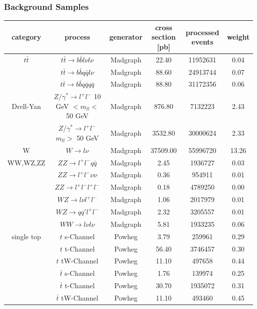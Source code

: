 \subsubsection{Background Samples} 
\begin{table}
\small
\begin{center}
\begin{tabular}{c|c|c|c|c|c}
category & process & generator &  cross section [pb] & processed events & weight\\
\hline 
$t\bar{t}$ & $t\bar{t} \rightarrow b\bar{b}l\nu l\nu$ & Madgraph & 22.40 & 11952631 & 0.04 \\
 & $t\bar{t} \rightarrow b\bar{b}q\bar{q}l\nu$ & Madgraph & 88.60 & 24913744 & 0.07 \\
 & $t\bar{t} \rightarrow b\bar{b}q\bar{q}q\bar{q}$ & Madgraph & 88.80 & 31172356 & 0.06 \\
\hline 
Drell-Yan & $Z/\gamma^{*} \rightarrow l^{+}l^{-}$ 10 GeV $< m_{ll} <$ 50 GeV & Madgraph & 876.80 & 7132223 & 2.43 \\
 & $Z/\gamma^{*} \rightarrow l^{+}l^{-}$ $m_{ll} >$ 50 GeV & Madgraph & 3532.80 & 30000624 & 2.33 \\
\hline 
W & $W \rightarrow l\nu$ & Madgraph & 37509.00 & 55996720 & 13.26 \\
\hline 
WW,WZ,ZZ & $ZZ \rightarrow l^{+}l^{-}q\bar{q}$ & Madgraph & 2.45 & 1936727 & 0.03 \\
 & $ZZ \rightarrow l^{+}l^{-}\nu\nu$ & Madgraph & 0.36 & 954911 & 0.01 \\
 & $ZZ \rightarrow l^{+}l^{-}l^{+}l^{-}$ & Madgraph & 0.18 & 4789250 & 0.00 \\
 & $WZ \rightarrow l\nu l^{+}l^{-}$ & Madgraph & 1.06 & 2017979 & 0.01 \\
 & $WZ \rightarrow qq'l^{+}l^{-}$ & Madgraph & 2.32 & 3205557 & 0.01 \\
 & $WW \rightarrow l\nu l\nu$ & Madgraph & 5.81 & 1933235 & 0.06 \\
\hline 
single top & $t$ s-Channel & Powheg & 3.79 & 259961 & 0.29 \\
 & $t$ t-Channel & Powheg & 56.40 & 3746457 & 0.30 \\
 & $t$ tW-Channel & Powheg & 11.10 & 497658 & 0.44 \\
 & $\bar{t}$ s-Channel & Powheg & 1.76 & 139974 & 0.25 \\
 & $\bar{t}$ t-Channel & Powheg & 30.70 & 1935072 & 0.31 \\
 & $\bar{t}$ tW-Channel & Powheg & 11.10 & 493460 & 0.45 \\

\end{tabular}
\end{center}
\end{table}
